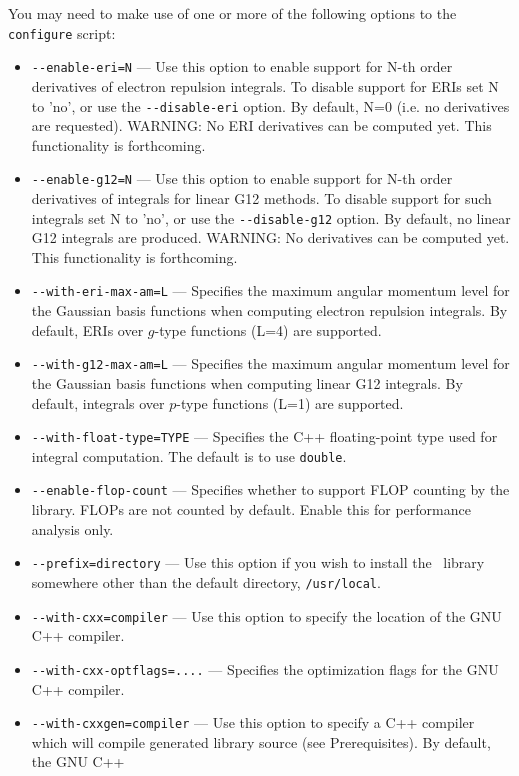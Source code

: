 \documentclass[12pt]{article}
\begin{document}
\noindent
You may need to make use of one or more of the following options to
the {\tt configure} script:
\begin{itemize}
\item {\tt -}{\tt -enable-eri=N} --- Use this option to enable support for
  N-th order derivatives of electron repulsion integrals. To
  disable support for ERIs set N to 'no', or use the {\tt -}{\tt -disable-eri} option.
  By default, N=0 (i.e. no derivatives are requested).
  WARNING: No ERI derivatives can be computed yet. This functionality is forthcoming.
\item {\tt -}{\tt -enable-g12=N} --- Use this option to enable support for
  N-th order derivatives of integrals for linear G12 methods. To
  disable support for such integrals set N to 'no', or use the {\tt -}{\tt -disable-g12} option.
  By default, no linear G12 integrals are produced.
  WARNING: No derivatives can be computed yet. This functionality is forthcoming.
\item {\tt -}{\tt -with-eri-max-am=L} --- Specifies the maximum
  angular momentum level for the Gaussian basis functions
  when computing electron repulsion integrals.  By default,
  ERIs over $g$-type functions (L=4) are supported.
\item {\tt -}{\tt -with-g12-max-am=L} --- Specifies the maximum
  angular momentum level for the Gaussian basis functions
  when computing linear G12 integrals.  By default,
  integrals over $p$-type functions (L=1) are supported.
\item {\tt -}{\tt -with-float-type=TYPE} --- Specifies the C++ floating-point type
  used for integral computation. The default is to use {\tt double}.
\item {\tt -}{\tt -enable-flop-count} --- Specifies whether to support FLOP counting
  by the library. FLOPs are not counted by default. Enable this for performance
  analysis only.
\item {\tt -}{\tt -prefix=directory} --- Use this option if you wish to
  install the \LIBINT\ library somewhere other than the default
  directory, {\tt /usr/local}.
\item {\tt -}{\tt -with-cxx=compiler} --- Use this option to specify the location
  of the GNU C++ compiler.
\item {\tt -}{\tt -with-cxx-optflags=....} --- Specifies the optimization flags for
  the GNU C++ compiler.
\item {\tt -}{\tt -with-cxxgen=compiler} --- Use this option to specify a C++ compiler
  which will compile generated library source (see Prerequisites). By default, the GNU C++

\end{itemize}
\end{document}
